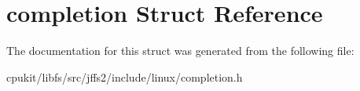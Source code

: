 \hypertarget{structcompletion}{}\section{completion Struct Reference}
\label{structcompletion}


The documentation for this struct was generated from the following file\+:\begin{DoxyCompactItemize}
\item 
cpukit/libfs/src/jffs2/include/linux/completion.\+h\end{DoxyCompactItemize}
